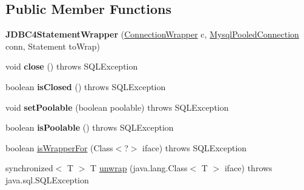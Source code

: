 \subsection*{Public Member Functions}
\begin{DoxyCompactItemize}
\item 
\mbox{\label{classcom_1_1mysql_1_1jdbc_1_1jdbc2_1_1optional_1_1_j_d_b_c4_statement_wrapper_a520ab6d3db9c3b7d3ec72378a33ca628}} 
{\bfseries J\+D\+B\+C4\+Statement\+Wrapper} (\mbox{\hyperlink{classcom_1_1mysql_1_1jdbc_1_1jdbc2_1_1optional_1_1_connection_wrapper}{Connection\+Wrapper}} c, \mbox{\hyperlink{classcom_1_1mysql_1_1jdbc_1_1jdbc2_1_1optional_1_1_mysql_pooled_connection}{Mysql\+Pooled\+Connection}} conn, Statement to\+Wrap)
\item 
\mbox{\label{classcom_1_1mysql_1_1jdbc_1_1jdbc2_1_1optional_1_1_j_d_b_c4_statement_wrapper_a84e8ddf5940fca4a8fc56f761cf5a4dc}} 
void {\bfseries close} ()  throws S\+Q\+L\+Exception 
\item 
\mbox{\label{classcom_1_1mysql_1_1jdbc_1_1jdbc2_1_1optional_1_1_j_d_b_c4_statement_wrapper_a54678171b22723edd24f7f5468cd17be}} 
boolean {\bfseries is\+Closed} ()  throws S\+Q\+L\+Exception 
\item 
\mbox{\label{classcom_1_1mysql_1_1jdbc_1_1jdbc2_1_1optional_1_1_j_d_b_c4_statement_wrapper_a72ca2645809d9a3d4fc4a8f096f97937}} 
void {\bfseries set\+Poolable} (boolean poolable)  throws S\+Q\+L\+Exception 
\item 
\mbox{\label{classcom_1_1mysql_1_1jdbc_1_1jdbc2_1_1optional_1_1_j_d_b_c4_statement_wrapper_a3ea5f1e3d58429801288a7611d0f9bcb}} 
boolean {\bfseries is\+Poolable} ()  throws S\+Q\+L\+Exception 
\item 
boolean \mbox{\hyperlink{classcom_1_1mysql_1_1jdbc_1_1jdbc2_1_1optional_1_1_j_d_b_c4_statement_wrapper_ae546da291666eae43135d8fe88ec8213}{is\+Wrapper\+For}} (Class$<$?$>$ iface)  throws S\+Q\+L\+Exception 
\item 
synchronized$<$ T $>$ T \mbox{\hyperlink{classcom_1_1mysql_1_1jdbc_1_1jdbc2_1_1optional_1_1_j_d_b_c4_statement_wrapper_ad1f87d00ae53bc32a204939318a628e0}{unwrap}} (java.\+lang.\+Class$<$ T $>$ iface)  throws java.\+sql.\+S\+Q\+L\+Exception 
\end{DoxyCompactItemize}
